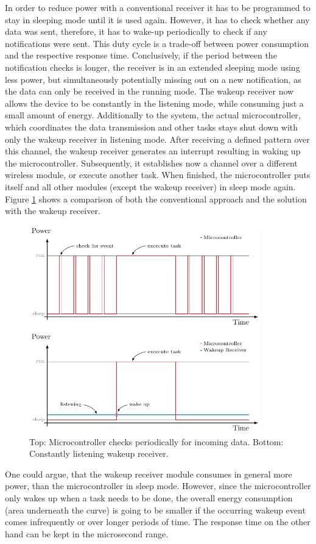 In order to reduce power with a conventional receiver it has to be programmed to stay in sleeping mode until it is used again. However, it has to check whether any data was sent, therefore, it has to wake-up periodically to check if any notifications were sent. This duty cycle is a trade-off between power consumption and the respective response time. Conclusively, if the period between the notification checks is longer, the receiver is in an extended sleeping mode using less power, but simultaneously potentially missing out on a new notification, as the data can only be received in the running mode. The wakeup receiver now allows the device to be constantly in the listening mode, while consuming just a small amount of energy. Additionally to the system, the actual microcontroller, which coordinates the data transmission and other tasks stays shut down with only the wakeup receiver in listening mode. After receiving a defined pattern over this channel, the wakeup receiver generates an interrupt resulting in waking up the microcontroller. Subsequently, it establishes now a channel over a different wireless module, or execute another task. When finished, the microcontroller puts itself and all other modules (except the wakeup receiver) in sleep mode again. Figure \ref{theory:wake} shows a comparison of both the conventional approach and the solution with the wakeup receiver.
\begin{figure}[ht]
	\centering
	\includegraphics[width=0.9\textwidth]{2-theory/wakeup/graphics/wake_comp.pdf}
	\caption{Top: Microcontroller checks periodically for incoming data. Bottom: Constantly listening  wakeup receiver.\label{theory:wake}}
\end{figure}
One could argue, that the wakeup receiver module consumes in general more power, than the
microcontroller in sleep mode. However, since the microcontroller only wakes up when a task needs to be done, the overall energy consumption (area underneath the curve) is going to be smaller if the occurring wakeup event comes infrequently or over longer periods of time. The response time on the other hand can be kept in the microsecond range.
